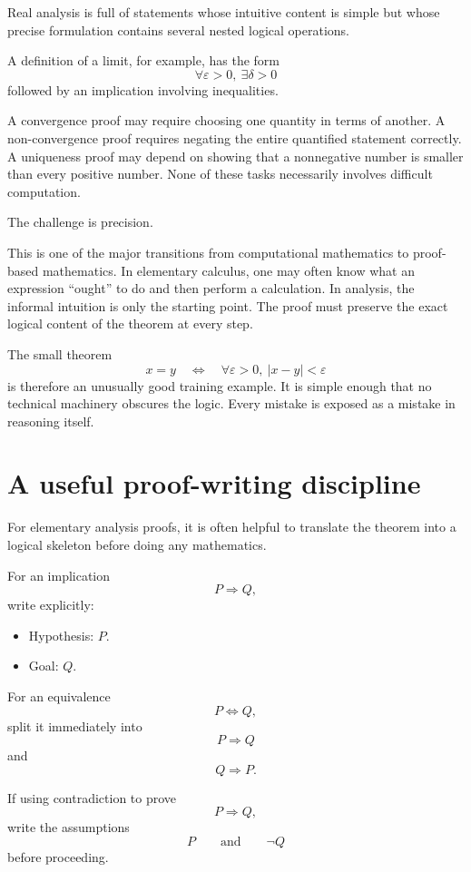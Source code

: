\documentclass{essay}
\begin{document}
Real analysis is full of statements whose intuitive content is simple but whose precise formulation contains several nested logical operations.

A definition of a limit, for example, has the form
\[ \forall \varepsilon>0,\ \exists \delta>0 \]
followed by an implication involving inequalities.

A convergence proof may require choosing one quantity in terms of another. A non-convergence proof requires negating the entire quantified statement correctly. A uniqueness proof may depend on showing that a nonnegative number is smaller than every positive number. None of these tasks necessarily involves difficult computation.

The challenge is precision.

This is one of the major transitions from computational mathematics to proof-based mathematics. In elementary calculus, one may often know what an expression ``ought'' to do and then perform a calculation. In analysis, the informal intuition is only the starting point. The proof must preserve the exact logical content of the theorem at every step.

The small theorem
\[ x=y \quad\Longleftrightarrow\quad \forall \varepsilon>0,\ |x-y|<\varepsilon \]
is therefore an unusually good training example. It is simple enough that no technical machinery obscures the logic. Every mistake is exposed as a mistake in reasoning itself.

\section{A useful proof-writing discipline}

For elementary analysis proofs, it is often helpful to translate the theorem into a logical skeleton before doing any mathematics.

For an implication
\[ P\Longrightarrow Q, \]
write explicitly:

\begin{itemize}
  \item Hypothesis: \(P\).
  \item Goal: \(Q\).
\end{itemize}

For an equivalence
\[ P\Longleftrightarrow Q, \]
split it immediately into
\[ P\Longrightarrow Q \]
and
\[ Q\Longrightarrow P. \]

If using contradiction to prove
\[ P\Longrightarrow Q, \]
write the assumptions
\[ P \qquad\text{and}\qquad \neg Q \]
before proceeding.
\end{document}
